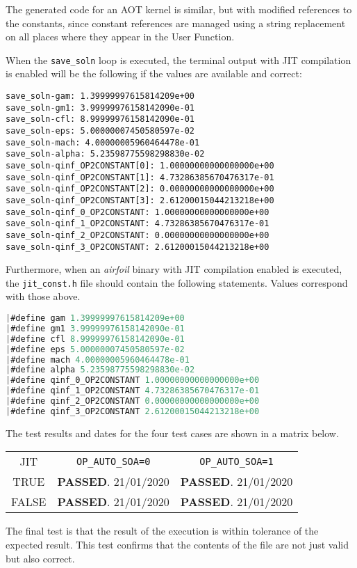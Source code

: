 \par
The generated code for an AOT kernel is similar, but with modified references to the constants, since constant references are managed using a string replacement on all places where they appear in the User Function.\par
\clearpage
\noindent When the \verb|save_soln| loop is executed, the terminal output with JIT compilation is enabled will be the following if the values are available and correct:
\begin{lstlisting}[frame=none]
save_soln-gam: 1.39999997615814209e+00
save_soln-gm1: 3.99999976158142090e-01
save_soln-cfl: 8.99999976158142090e-01
save_soln-eps: 5.00000007450580597e-02
save_soln-mach: 4.00000005960464478e-01
save_soln-alpha: 5.23598775598298830e-02
save_soln-qinf_OP2CONSTANT[0]: 1.00000000000000000e+00
save_soln-qinf_OP2CONSTANT[1]: 4.73286385670476317e-01
save_soln-qinf_OP2CONSTANT[2]: 0.00000000000000000e+00
save_soln-qinf_OP2CONSTANT[3]: 2.61200015044213218e+00
save_soln-qinf_0_OP2CONSTANT: 1.00000000000000000e+00
save_soln-qinf_1_OP2CONSTANT: 4.73286385670476317e-01
save_soln-qinf_2_OP2CONSTANT: 0.00000000000000000e+00
save_soln-qinf_3_OP2CONSTANT: 2.61200015044213218e+00
\end{lstlisting}

\noindent Furthermore, when an \textit{airfoil} binary with JIT compilation enabled is executed, the \verb|jit_const.h| file should contain the following statements. Values correspond with those above.
\begin{lstlisting}[backgroundcolor=\color{green!20}, language=C]
|#define gam 1.39999997615814209e+00
|#define gm1 3.99999976158142090e-01
|#define cfl 8.99999976158142090e-01
|#define eps 5.00000007450580597e-02
|#define mach 4.00000005960464478e-01
|#define alpha 5.23598775598298830e-02
|#define qinf_0_OP2CONSTANT 1.00000000000000000e+00
|#define qinf_1_OP2CONSTANT 4.73286385670476317e-01
|#define qinf_2_OP2CONSTANT 0.00000000000000000e+00
|#define qinf_3_OP2CONSTANT 2.61200015044213218e+00
\end{lstlisting}
\vfill
\noindent The test results and dates for the four test cases are shown in a matrix below.
\begin{table}[h]
\centering
\renewcommand{\arraystretch}{1.5}
\begin{tabular}{| c || c | c |}
\hline
JIT & \verb|OP_AUTO_SOA=0| & \verb|OP_AUTO_SOA=1| \\
\hhline{|=|=|=|}
TRUE &\textbf{\textcolor{green!20!black}{PASSED}}. 21/01/2020 &\textbf{\textcolor{green!20!black}{PASSED}}. 21/01/2020 \\
\hline
FALSE&\textbf{\textcolor{green!20!black}{PASSED}}. 21/01/2020 &\textbf{\textcolor{green!20!black}{PASSED}}. 21/01/2020 \\
\hline
\end{tabular}
\end{table}
\clearpage
{}
The final test is that the result of the execution is within tolerance of the expected result. This test confirms that the contents of the file are not just valid but also correct.

